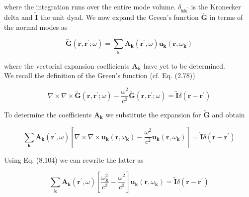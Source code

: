 \documentclass[10pt]{article}
\begin{document}
where the integration runs over the entire mode volume. $\delta_{\mathbf{k k}^{\prime}}$ is the Kronecker delta and $\overleftrightarrow{\mathbf{I}}$ the unit dyad. We now expand the Green's function $\overleftrightarrow{\mathbf{G}}$ in terms of the normal modes as


\begin{equation*}
\overleftrightarrow{\mathbf{G}}\left(\mathbf{r}, \mathbf{r}^{\prime} ; \omega\right)=\sum_{\mathbf{k}} \mathbf{A}_{\mathbf{k}}\left(\mathbf{r}^{\prime}, \omega\right) \mathbf{u}_{\mathbf{k}}\left(\mathbf{r}, \omega_{\mathbf{k}}\right) \tag{8.106}
\end{equation*}


where the vectorial expansion coefficients $\mathbf{A}_{\mathbf{k}}$ have yet to be determined.\\
We recall the definition of the Green's function (cf. Eq. (2.78))


\begin{equation*}
\nabla \times \nabla \times \overleftrightarrow{\mathbf{G}}\left(\mathbf{r}, \mathbf{r}^{\prime} ; \omega\right)-\frac{\omega^{2}}{c^{2}} \overleftrightarrow{\mathbf{G}}\left(\mathbf{r}, \mathbf{r}^{\prime} ; \omega\right)=\overleftrightarrow{\mathbf{I}} \delta\left(\mathbf{r}-\mathbf{r}^{\prime}\right) \tag{8.107}
\end{equation*}


To determine the coefficients $\mathbf{A}_{\mathbf{k}}$ we substitute the expansion for $\overleftrightarrow{\mathbf{G}}$ and obtain


\begin{equation*}
\sum_{\mathbf{k}} \mathbf{A}_{\mathbf{k}}\left(\mathbf{r}^{\prime}, \omega\right)\left[\nabla \times \nabla \times \mathbf{u}_{\mathbf{k}}\left(\mathbf{r}, \omega_{\mathbf{k}}\right)-\frac{\omega^{2}}{c^{2}} \mathbf{u}_{\mathbf{k}}\left(\mathbf{r}, \omega_{\mathbf{k}}\right)\right]=\overleftrightarrow{\mathbf{I}} \delta\left(\mathbf{r}-\mathbf{r}^{\prime}\right) \tag{8.108}
\end{equation*}


Using Eq. (8.104) we can rewrite the latter as


\begin{equation*}
\sum_{\mathbf{k}} \mathbf{A}_{\mathbf{k}}\left(\mathbf{r}^{\prime}, \omega\right)\left[\frac{\omega_{\mathbf{k}}^{2}}{c^{2}}-\frac{\omega^{2}}{c^{2}}\right] \mathbf{u}_{\mathbf{k}}\left(\mathbf{r}, \omega_{\mathbf{k}}\right)=\overleftrightarrow{\mathbf{I}} \delta\left(\mathbf{r}-\mathbf{r}^{\prime}\right) \tag{8.109}
\end{equation*}
\end{document}
